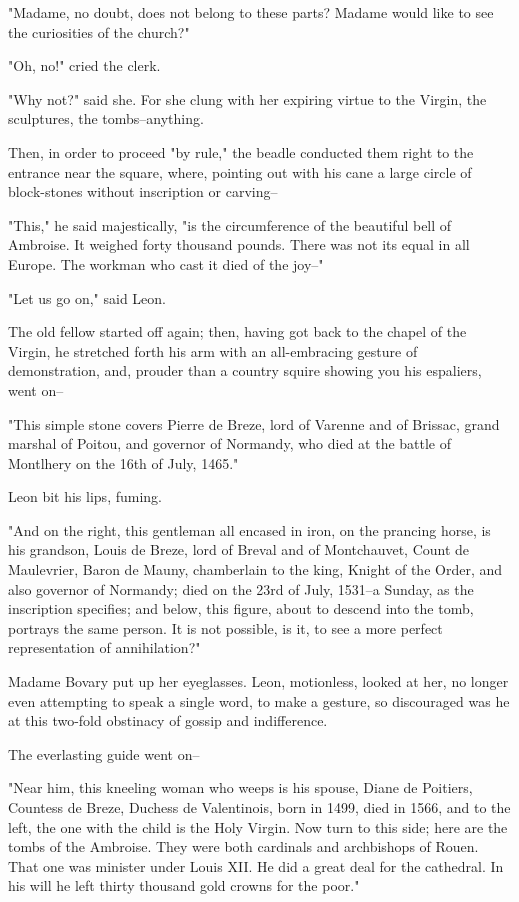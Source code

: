 \documentclass{tufte-book}
\begin{document}
"Madame, no doubt, does not belong to these parts? Madame would like to
see the curiosities of the church?"

"Oh, no!" cried the clerk.

"Why not?" said she. For she clung with her expiring virtue to the
Virgin, the sculptures, the tombs--anything.

Then, in order to proceed "by rule," the beadle conducted them right to
the entrance near the square, where, pointing out with his cane a large
circle of block-stones without inscription or carving--

"This," he said majestically, "is the circumference of the beautiful
bell of Ambroise. It weighed forty thousand pounds. There was not its
equal in all Europe. The workman who cast it died of the joy--"

"Let us go on," said Leon.

The old fellow started off again; then, having got back to the chapel of
the Virgin, he stretched forth his arm with an all-embracing gesture
of demonstration, and, prouder than a country squire showing you his
espaliers, went on--

"This simple stone covers Pierre de Breze, lord of Varenne and of
Brissac, grand marshal of Poitou, and governor of Normandy, who died at
the battle of Montlhery on the 16th of July, 1465."

Leon bit his lips, fuming.

"And on the right, this gentleman all encased in iron, on the
prancing horse, is his grandson, Louis de Breze, lord of Breval and of
Montchauvet, Count de Maulevrier, Baron de Mauny, chamberlain to the
king, Knight of the Order, and also governor of Normandy; died on the
23rd of July, 1531--a Sunday, as the inscription specifies; and below,
this figure, about to descend into the tomb, portrays the same person.
It is not possible, is it, to see a more perfect representation of
annihilation?"

Madame Bovary put up her eyeglasses. Leon, motionless, looked at her,
no longer even attempting to speak a single word, to make a gesture,
so discouraged was he at this two-fold obstinacy of gossip and
indifference.

The everlasting guide went on--

"Near him, this kneeling woman who weeps is his spouse, Diane de
Poitiers, Countess de Breze, Duchess de Valentinois, born in 1499, died
in 1566, and to the left, the one with the child is the Holy Virgin. Now
turn to this side; here are the tombs of the Ambroise. They were both
cardinals and archbishops of Rouen. That one was minister under Louis
XII. He did a great deal for the cathedral. In his will he left thirty
thousand gold crowns for the poor."
\end{document}
